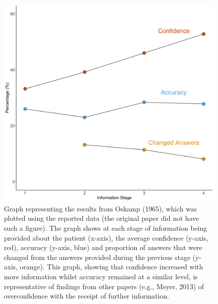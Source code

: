 \documentclass[a4paper, nobind]{templates/ociamthesis}
\begin{document}
\newpage

\begin{figure}[H]

{\centering \includegraphics[width=1\linewidth]{./assets/OskampGraph} 

}

\caption[Graph representing the results from Oskamp (1965)]{Graph representing the results from Oskamp (1965), which was plotted using the reported data (the original paper did not have such a figure). The graph shows at each stage of information being provided about the patient (x-axis), the average confidence (y-axis, red), accuracy (y-axis, blue) and proportion of answers that were changed from the answers provided during the previous stage (y-axis, orange). This graph, showing that confidence increased with more information whilst accuracy remained at a similar level, is representative of findings from other papers (e.g., Meyer, 2013) of overconfidence with the receipt of further information.}\label{fig:oskamp}
\end{figure}
\end{document}
